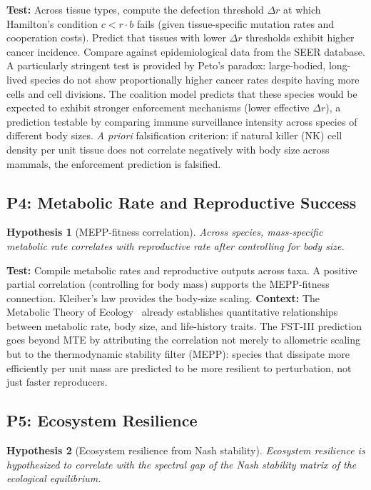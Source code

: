 \documentclass[12pt,a4paper]{article}
\newtheorem{hypothesis}{Hypothesis}
\theoremstyle{remark}
\begin{document}
\textbf{Test:} Across tissue types, compute the defection threshold $\Delta r$ at which Hamilton's condition $c < r \cdot b$ fails (given tissue-specific mutation rates and cooperation costs). Predict that tissues with lower $\Delta r$ thresholds exhibit higher cancer incidence. Compare against epidemiological data from the SEER database. A particularly stringent test is provided by Peto's paradox: large-bodied, long-lived species do not show proportionally higher cancer rates despite having more cells and cell divisions. The coalition model predicts that these species would be expected to exhibit stronger enforcement mechanisms (lower effective $\Delta r$), a prediction testable by comparing immune surveillance intensity across species of different body sizes. \textit{A priori} falsification criterion: if natural killer (NK) cell density per unit tissue does not correlate negatively with body size across mammals, the enforcement prediction is falsified.

\subsection{P4: Metabolic Rate and Reproductive Success}

\begin{hypothesis}[MEPP-fitness correlation]
Across species, mass-specific metabolic rate correlates with reproductive rate after controlling for body size.
\end{hypothesis}

\textbf{Test:} Compile metabolic rates and reproductive outputs across taxa. A positive partial correlation (controlling for body mass) supports the MEPP-fitness connection. Kleiber's law provides the body-size scaling. \textbf{Context:} The Metabolic Theory of Ecology~\citep{BrownMTE2004} already establishes quantitative relationships between metabolic rate, body size, and life-history traits. The FST-III prediction goes beyond MTE by attributing the correlation not merely to allometric scaling but to the thermodynamic stability filter (MEPP): species that dissipate more efficiently per unit mass are predicted to be more resilient to perturbation, not just faster reproducers.

\subsection{P5: Ecosystem Resilience}

\begin{hypothesis}[Ecosystem resilience from Nash stability]
Ecosystem resilience is hypothesized to correlate with the spectral gap of the Nash stability matrix of the ecological equilibrium.
\end{hypothesis}
\end{document}
